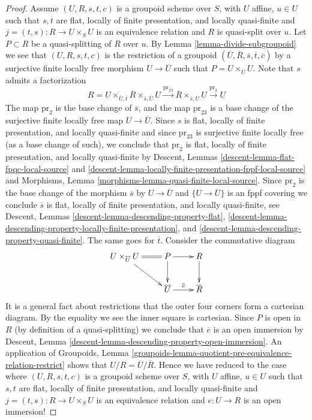 \documentclass[10pt,a4paper]{amsart}
\theoremstyle{plain}
\theoremstyle{definition}
\theoremstyle{remark}
\numberwithin{equation}{subsection}
\begin{document}
\begin{proof}
\medskip\noindent
Assume $(U, R, s, t, c)$ is a groupoid scheme over $S$,
with $U$ affine, $u \in U$ such that $s, t$ are flat, locally
of finite presentation, and locally quasi-finite and
$j = (t, s) : R \to U \times_S U$ is an equivalence relation
and $R$ is quasi-split over $u$. Let $P \subset R$ be a quasi-splitting
of $R$ over $u$. By
Lemma \ref{lemma-divide-subgroupoid}
we see that $(U, R, s, t, c)$ is the restriction of a groupoid
$(\overline{U}, \overline{R}, \overline{s}, \overline{t}, \overline{c})$
by a surjective finite locally free morphism $U \to \overline{U}$ such that
$P = U \times_{\overline{U}} U$. Note that $s$ admits a factorization
$$
R = U \times_{\overline{U}, \overline{t}} \overline{R}
\times_{\overline{s}, \overline{U}} U
\xrightarrow{\text{pr}_{23}}
\overline{R} \times_{\overline{s}, \overline{U}} U
\xrightarrow{\text{pr}_2} U
$$
The map $\text{pr}_2$ is the base change of $\overline{s}$, and
the map $\text{pr}_{23}$ is a base change of the surjective finite locally
free map $U \to \overline{U}$. Since $s$ is flat, locally
of finite presentation, and locally quasi-finite and since $\text{pr}_{23}$
is surjective finite locally free (as a base change of such), we
conclude that $\text{pr}_2$ is flat, locally
of finite presentation, and locally quasi-finite by
Descent, Lemmas
\ref{descent-lemma-flat-fpqc-local-source} and
\ref{descent-lemma-locally-finite-presentation-fppf-local-source} and
Morphisms, Lemma \ref{morphisms-lemma-quasi-finite-local-source}.
Since $\text{pr}_2$ is the base change of the morphism
$\overline{s}$ by $U \to \overline{U}$ and $\{U \to \overline{U}\}$
is an fppf covering we conclude $\overline{s}$ is
flat, locally of finite presentation, and locally quasi-finite, see
Descent, Lemmas \ref{descent-lemma-descending-property-flat},
\ref{descent-lemma-descending-property-locally-finite-presentation}, and
\ref{descent-lemma-descending-property-quasi-finite}. The same goes
for $\overline{t}$. Consider the commutative diagram
$$
\xymatrix{
U \times_{\overline{U}} U \ar@{=}[r] \ar[rd] & P \ar[r] \ar[d] & R \ar[d] \\
& \overline{U} \ar[r]^{\overline{e}} & \overline{R}
}
$$
It is a general fact about restrictions that the outer four corners
form a cartesian diagram. By the equality we see the inner square is
cartesian. Since $P$ is open in $R$ (by definition of a quasi-splitting)
we conclude that $\overline{e}$ is an open immersion by
Descent, Lemma \ref{descent-lemma-descending-property-open-immersion}.
An application of
Groupoids,
Lemma \ref{groupoids-lemma-quotient-pre-equivalence-relation-restrict}
shows that $U/R = \overline{U}/\overline{R}$. Hence we have reduced to
the case where $(U, R, s, t, c)$ is a groupoid scheme over $S$,
with $U$ affine, $u \in U$ such that $s, t$ are flat, locally
of finite presentation, and locally quasi-finite and
$j = (t, s) : R \to U \times_S U$ is an equivalence relation
and $e : U \to R$ is an open immersion!


\end{proof}
\end{document}
